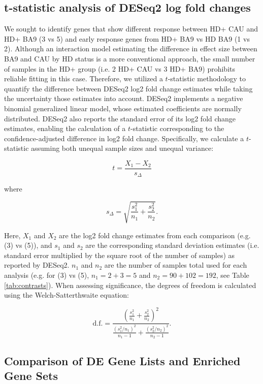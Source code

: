 \documentclass[fleqn,10pt,table]{wlscirep}
\begin{document}
\subsection{t-statistic analysis of DESeq2 log fold changes}

We sought to identify genes that show different response between HD+ CAU and HD+ BA9 (3 vs 5) and early response genes from HD+ BA9 vs HD BA9 (1 vs 2).
Although an interaction model estimating the difference in effect size between BA9 and CAU by HD status is a more conventional approach, the small number of samples in the HD+ group (i.e. 2 HD+ CAU vs 3 HD+ BA9) prohibits reliable fitting in this case.
Therefore, we utilized a $t$-statistic methodology to quantify the difference between DESeq2 log2 fold change estimates while taking the uncertainty those estimates into account.
DESeq2 implements a negative binomial generalized linear model, whose estimated coefficients are normally distributed.
DESeq2 also reports the standard error of its log2 fold change estimates, enabling the calculation of a $t$-statistic corresponding to the confidence-adjusted difference in log2 fold change.
Specifically, we calculate a $t$-statistic assuming both unequal sample sizes and unequal variance:

$$
t = \frac{X_1 - X_2}{s_{\Delta}}
$$

where

$$
s_{\Delta} = \sqrt{\frac{s_1^2}{n_1} + \frac{s_2^2}{n_2}}.
$$

Here, $X_1$ and $X_2$ are the log2 fold change estimates from each comparison (e.g. (3) vs (5)), and $s_1$ and $s_2$ are the corresponding standard deviation estimates (i.e. standard error multiplied by the square root of the number of samples) as reported by DESeq2.
$n_1$ and $n_2$ are the number of samples total used for each analysis (e.g. for (3) vs (5), $n_1 = 2+3 = 5$ and $n_2 = 90+102 = 192$, see Table \ref{tab:contrasts}).
When assessing significance, the degrees of freedom is calculated using the Welch-Satterthwaite equation:

$$
\text{d.f.} = \frac{
    \left ( \frac{s_1^2}{n_1} + \frac{s_2^2}{n_2} \right )^2
} {
    \frac{(s_1^2/n_1)^2}{n_1-1} +
    \frac{(s_2^2/n_2)^2}{n_2-1}
}.
$$

\subsection{Comparison of DE Gene Lists and Enriched Gene Sets}
\end{document}
